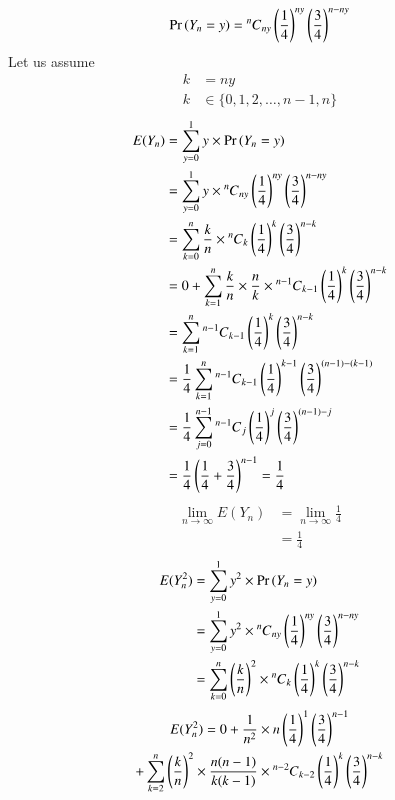 \documentclass[journal,12pt,twocolumn]{IEEEtran}
\begin{document}
\begin{align}
    \Pr{(Y_n = y)} = \comb[n]{ny} \brak{\frac{1}{4}}^{ny} \brak{\frac{3}{4}}^{n-ny}
\end{align}
Let us assume
\begin{align}
    k &= ny
    \\k &\in \{0,1,2,\hdots,n-1,n\}
\end{align}
\begin{align}
    E(Y_n) &= \sum_{y=0}^{1}y\times  \Pr{(Y_n = y)}
    \\&= \sum_{y=0}^{1}y\times \comb[n]{ny}\brak{\frac{1}{4}}^{ny} \brak{\frac{3}{4}}^{n-ny}
    \\&= \sum_{k=0}^{n} \frac{k}{n}\times\comb[n]{k}\brak{\frac{1}{4}}^{k} \brak{\frac{3}{4}}^{n-k}
    \\&= 0 + \sum_{k=1}^{n} \frac{k}{n}\times\frac{n}{k}\times\comb[n-1]{k-1}\brak{\frac{1}{4}}^{k} \brak{\frac{3}{4}}^{n-k}
    \\&= \sum_{k=1}^{n} \comb[n-1]{k-1}\brak{\frac{1}{4}}^{k} \brak{\frac{3}{4}}^{n-k}
    \\&= \frac{1}{4} \sum_{k=1}^{n} \comb[n-1]{k-1}\brak{\frac{1}{4}}^{k-1} \brak{\frac{3}{4}}^{(n-1)-(k-1)}
    \\&= \frac{1}{4} \sum_{j=0}^{n-1} \comb[n-1]{j}\brak{\frac{1}{4}}^{j} \brak{\frac{3}{4}}^{(n-1)-j}
    \\&= \frac{1}{4} \brak{\frac{1}{4} + \frac{3}{4}}^{n-1} = \frac{1}{4}
\end{align}
\begin{align}
    \lim_{n\rightarrow \infty} E(Y_n) &= \lim_{n\rightarrow \infty} \frac{1}{4} 
    \\&= \frac{1}{4}
\end{align}
\begin{align}
    E(Y_n^2) &= \sum_{y=0}^{1}y^2\times  \Pr{(Y_n = y)}
    \\&= \sum_{y=0}^{1}y^2\times \comb[n]{ny}\brak{\frac{1}{4}}^{ny} \brak{\frac{3}{4}}^{n-ny}
    \\&= \sum_{k=0}^{n} \brak{\frac{k}{n}}^2\times\comb[n]{k}\brak{\frac{1}{4}}^{k} \brak{\frac{3}{4}}^{n-k}
\end{align}
\begin{multline}
    E(Y_n^2) = 0 + \frac{1}{n^2}\times n\brak{\frac{1}{4}}^{1} \brak{\frac{3}{4}}^{n-1} 
    \\+ \sum_{k=2}^{n} \brak{\frac{k}{n}}^2\times\frac{n(n-1)}{k(k-1)}
    \times\comb[n-2]{k-2}\brak{\frac{1}{4}}^{k} \brak{\frac{3}{4}}^{n-k}
\end{multline}
\end{document}
